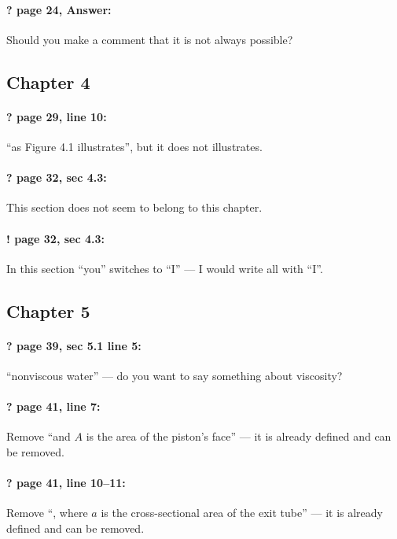 \documentclass[twoside]{article}
\begin{document}
\paragraph{? page 24, Answer:} Should you make a comment that it is not always possible?

\subsection*{Chapter 4}

\paragraph{? page 29, line 10:} ``as Figure 4.1 illustrates'', but it does not illustrates.

\paragraph{? page 32, sec 4.3:} This section does not seem to belong to this chapter.

\paragraph{! page 32, sec 4.3:} In this section ``you'' switches to ``I'' --- I would write all with ``I''.

\subsection*{Chapter 5}

\paragraph{? page 39, sec 5.1 line 5:} ``nonviscous water'' --- do you want to say something about viscosity?

\paragraph{? page 41, line 7:} Remove ``and $A$ is the area of the piston’s face'' --- it is already defined and can be removed.

\paragraph{? page 41, line 10--11:} Remove ``, where $a$ is the cross-sectional area of the exit tube'' --- it is already defined and can be removed.
\end{document}
